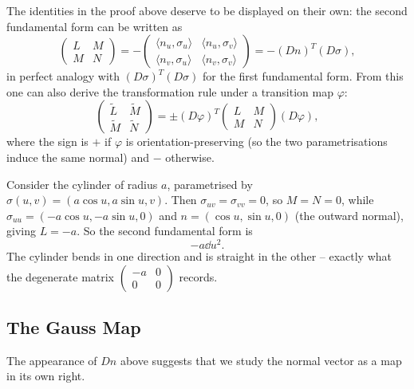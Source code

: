 The identities in the proof above deserve to be displayed on their own: the second fundamental form can be written as
$$
\begin{pmatrix} L & M \\ M & N \end{pmatrix} = -\begin{pmatrix} \langle n_u , \sigma_u \rangle & \langle n_u, \sigma_v \rangle \\ \langle n_v, \sigma_u \rangle & \langle n_v, \sigma_v \rangle \end{pmatrix} = -(Dn)^T (D\sigma),
$$
in perfect analogy with $(D\sigma)^T(D\sigma)$ for the first fundamental form. From this one can also derive the transformation rule under a transition map $\varphi$:
$$
\begin{pmatrix} \tilde L & \tilde M \\ \tilde M & \tilde N \end{pmatrix} = \pm (D\varphi)^T \begin{pmatrix} L & M \\ M & N\end{pmatrix} (D\varphi),
$$
where the sign is $+$ if $\varphi$ is orientation-preserving (so the two parametrisations induce the same normal) and $-$ otherwise.

\begin{example}
    Consider the cylinder of radius $a$, parametrised by $\sigma(u, v) = (a \cos u, a \sin u, v)$. Then $\sigma_{uv} = \sigma_{vv} = 0$, so $M = N = 0$, while $\sigma_{uu} = (-a\cos u, -a \sin u, 0)$ and $n = (\cos u, \sin u, 0)$ (the outward normal), giving $L = -a$. So the second fundamental form is
    $$
    -a \dd u^2.
    $$
    The cylinder bends in one direction and is straight in the other -- exactly what the degenerate matrix $\begin{pmatrix} -a & 0 \\ 0 & 0\end{pmatrix}$ records.
\end{example}

\subsection{The Gauss Map}

The appearance of $Dn$ above suggests that we study the normal vector as a map in its own right.

